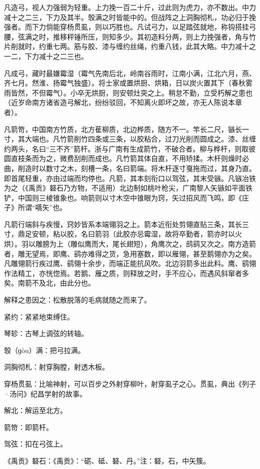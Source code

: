 \documentclass[12pt,UTF8]{ctexbook}
\begin{document}
凡造弓，视人力强弱为轻重。上力挽一百二十斤，过此则为虎力，亦不数出。中力减十之二三，下力及其半。彀满之时皆能中的。但战阵之上洞胸彻札，功必归于挽强者。而下力倘能穿杨贯虱，则以巧胜也。凡试弓力，以足踏弦就地，称钩搭挂弓腰，弦满之时，推移秤锤所压，则知多少。其初造料分两，则上力挽强者，角与竹片削就时，约重七两。筋与胶、漆与缠约丝绳，约重八钱，此其大略。中力减十之一二，下力减十之二三也。

凡成弓，藏时最嫌霉湿（霉气先南后北，岭南谷雨时，江南小满，江北六月，燕、齐七月。然淮、扬霉气独盛）。将士家或置烘厨、烘箱，日以炭火置其下（春秋雾雨皆然，不但霉气）。小卒无烘厨，则安顿灶突之上。稍怠不勤，立受朽解之患也（近岁命南方诸省造弓解北，纷纷驳回，不知离火即坏之故，亦无人陈说本章者）。

凡箭笴，中国南方竹质，北方萑柳质，北边桦质，随方不一。竿长二尺，镞长一寸，其大端也。凡竹箭削竹四条或三条，以胶粘合，过刀光削而圆成之。漆、丝缠约两头，名曰“三不齐”箭杆。浙与广南有生成箭竹，不破合者。柳与桦杆，则取彼圆直枝条而为之，微费刮削而成也。凡竹箭其体自直，不用矫揉。木杆则燥时必曲，削造时以数寸之木，刻槽一条，名曰箭端。将木杆逐寸戛拖而过，其身乃直。即首尾轻重，亦由过端而均停也。凡箭，其本刻衔口以驾弦，其末受镞。凡镞冶铁为之（《禹贡》砮石乃方物，不适用）北边制如桃叶枪尖，广南黎人矢镞如平面铁铲，中国则三棱锥象也。响箭则以寸木空中锥眼为窍，矢过招风而飞鸣，即《庄子》所谓“嚆矢”也。

凡箭行端斜与疾慢，窍妙皆系本端翎羽之上。箭本近衔处剪翎直贴三条，其长三寸，鼎足安顿，粘以胶，名曰箭羽（此胶亦忌霉湿，故将卒勤者，箭亦时以火烘）。羽以雕膀为上（雕似鹰而大，尾长翅短），角鹰次之，鸱鹞又次之。南方造箭者，雕无望焉，即鹰、鹞亦难得之货，急用塞数，即以雁翎，甚至鹅翎亦为之矣。凡雕翎箭行疾过鹰、鹞翎十余步，而端正能抗风吹。北边羽箭多出此料。鹰、鹞翎作法精工，亦恍惚焉。若鹅、雁之质，则释放之时，手不应心，而遇风斜窜者多矣。南箭不及北，由此分也。

解释之患因之：松散脱落的毛病就随之而来了。

紧约：紧紧地束缚住。

琴轸：古琴上调弦的转轴。

彀（ɡòu）满：把弓拉满。

洞胸彻札：射穿胸膛，射透木板。

穿杨贯虱：比喻神射，可以百步之外射穿柳叶，射穿虱子之心。贯虱，典出《列子·汤问》纪昌学射的故事。

解北：解运至北方。

箭笴：即箭杆。

驾弦：扣在弓弦上。

《禹贡》砮石：《禹贡》：“砺、砥、砮、丹。”注：砮，石，中矢簇。
\end{document}
